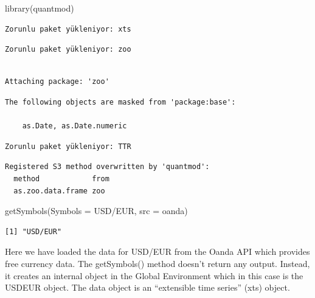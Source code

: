 \documentclass[
  letterpaper,
  DIV=11,
  numbers=noendperiod]{scrreprt}
\newenvironment{Shaded}{\begin{snugshade}}{\end{snugshade}}
\newcommand{\AttributeTok}[1]{\textcolor[rgb]{0.40,0.45,0.13}{#1}}
\newcommand{\FunctionTok}[1]{\textcolor[rgb]{0.28,0.35,0.67}{#1}}
\newcommand{\NormalTok}[1]{\textcolor[rgb]{0.00,0.23,0.31}{#1}}
\newcommand{\StringTok}[1]{\textcolor[rgb]{0.13,0.47,0.30}{#1}}
\begin{document}
\begin{Shaded}
\begin{Highlighting}[]
\FunctionTok{library}\NormalTok{(}\StringTok{\textquotesingle{}quantmod\textquotesingle{}}\NormalTok{)}
\end{Highlighting}
\end{Shaded}

\begin{verbatim}
Zorunlu paket yükleniyor: xts
\end{verbatim}

\begin{verbatim}
Zorunlu paket yükleniyor: zoo
\end{verbatim}

\begin{verbatim}

Attaching package: 'zoo'
\end{verbatim}

\begin{verbatim}
The following objects are masked from 'package:base':

    as.Date, as.Date.numeric
\end{verbatim}

\begin{verbatim}
Zorunlu paket yükleniyor: TTR
\end{verbatim}

\begin{verbatim}
Registered S3 method overwritten by 'quantmod':
  method            from
  as.zoo.data.frame zoo 
\end{verbatim}

\begin{Shaded}
\begin{Highlighting}[]
\FunctionTok{getSymbols}\NormalTok{(}\AttributeTok{Symbols =} \StringTok{\textquotesingle{}USD/EUR\textquotesingle{}}\NormalTok{, }\AttributeTok{src =} \StringTok{\textquotesingle{}oanda\textquotesingle{}}\NormalTok{)}
\end{Highlighting}
\end{Shaded}

\begin{verbatim}
[1] "USD/EUR"
\end{verbatim}

Here we have loaded the data for USD/EUR from the Oanda API which
provides free currency data. The getSymbols() method doesn't return any
output. Instead, it creates an internal object in the Global Environment
which in this case is the USDEUR object. The data object is an
``extensible time series'' (xts) object.
\end{document}
